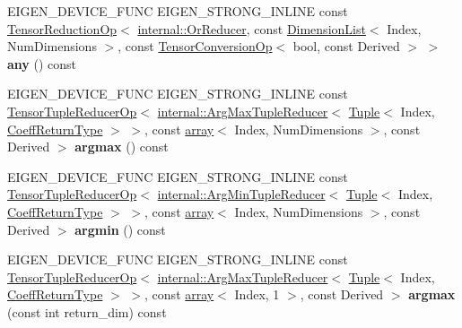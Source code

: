 \begin{DoxyCompactItemize}
E\+I\+G\+E\+N\+\_\+\+D\+E\+V\+I\+C\+E\+\_\+\+F\+U\+NC E\+I\+G\+E\+N\+\_\+\+S\+T\+R\+O\+N\+G\+\_\+\+I\+N\+L\+I\+NE const \hyperlink{class_eigen_1_1_tensor_reduction_op}{Tensor\+Reduction\+Op}$<$ \hyperlink{struct_eigen_1_1internal_1_1_or_reducer}{internal\+::\+Or\+Reducer}, const \hyperlink{struct_eigen_1_1_dimension_list}{Dimension\+List}$<$ Index, Num\+Dimensions $>$, const \hyperlink{class_eigen_1_1_tensor_conversion_op}{Tensor\+Conversion\+Op}$<$ bool, const Derived $>$ $>$ {\bfseries any} () const
\item 
\mbox{\label{class_eigen_1_1_tensor_base_3_01_derived_00_01_read_only_accessors_01_4_a836f643e61da57db7f53ad59d0cf3de1}} 
E\+I\+G\+E\+N\+\_\+\+D\+E\+V\+I\+C\+E\+\_\+\+F\+U\+NC E\+I\+G\+E\+N\+\_\+\+S\+T\+R\+O\+N\+G\+\_\+\+I\+N\+L\+I\+NE const \hyperlink{class_eigen_1_1_tensor_tuple_reducer_op}{Tensor\+Tuple\+Reducer\+Op}$<$ \hyperlink{struct_eigen_1_1internal_1_1_arg_max_tuple_reducer}{internal\+::\+Arg\+Max\+Tuple\+Reducer}$<$ \hyperlink{struct_eigen_1_1_tuple}{Tuple}$<$ Index, \hyperlink{group___sparse_core___module}{Coeff\+Return\+Type} $>$ $>$, const \hyperlink{class_eigen_1_1array}{array}$<$ Index, Num\+Dimensions $>$, const Derived $>$ {\bfseries argmax} () const
\item 
\mbox{\label{class_eigen_1_1_tensor_base_3_01_derived_00_01_read_only_accessors_01_4_a6ae2192aca68b25dea6d329ff2961128}} 
E\+I\+G\+E\+N\+\_\+\+D\+E\+V\+I\+C\+E\+\_\+\+F\+U\+NC E\+I\+G\+E\+N\+\_\+\+S\+T\+R\+O\+N\+G\+\_\+\+I\+N\+L\+I\+NE const \hyperlink{class_eigen_1_1_tensor_tuple_reducer_op}{Tensor\+Tuple\+Reducer\+Op}$<$ \hyperlink{struct_eigen_1_1internal_1_1_arg_min_tuple_reducer}{internal\+::\+Arg\+Min\+Tuple\+Reducer}$<$ \hyperlink{struct_eigen_1_1_tuple}{Tuple}$<$ Index, \hyperlink{group___sparse_core___module}{Coeff\+Return\+Type} $>$ $>$, const \hyperlink{class_eigen_1_1array}{array}$<$ Index, Num\+Dimensions $>$, const Derived $>$ {\bfseries argmin} () const
\item 
\mbox{\label{class_eigen_1_1_tensor_base_3_01_derived_00_01_read_only_accessors_01_4_a10f6d4157bf82f9f71d1e03e07498c4e}} 
E\+I\+G\+E\+N\+\_\+\+D\+E\+V\+I\+C\+E\+\_\+\+F\+U\+NC E\+I\+G\+E\+N\+\_\+\+S\+T\+R\+O\+N\+G\+\_\+\+I\+N\+L\+I\+NE const \hyperlink{class_eigen_1_1_tensor_tuple_reducer_op}{Tensor\+Tuple\+Reducer\+Op}$<$ \hyperlink{struct_eigen_1_1internal_1_1_arg_max_tuple_reducer}{internal\+::\+Arg\+Max\+Tuple\+Reducer}$<$ \hyperlink{struct_eigen_1_1_tuple}{Tuple}$<$ Index, \hyperlink{group___sparse_core___module}{Coeff\+Return\+Type} $>$ $>$, const \hyperlink{class_eigen_1_1array}{array}$<$ Index, 1 $>$, const Derived $>$ {\bfseries argmax} (const int return\+\_\+dim) const

\end{DoxyCompactItemize}
